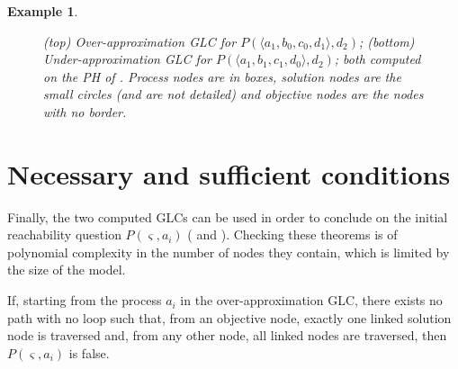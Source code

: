 \documentclass{movep}
\def\pref{\prettyref}
\newtheorem*{example*}{Example}{\itshape}{}
\newcommand{\PHfrappeB}{\Rsh}
\newcommand{\PHobjectif}[2]{\mbox{$#1\PHfrappeB^*\!#2$}}
\newcommand{\PHobj}{\PHobjectif}
\def\ctx{\varsigma}
\newcommand{\Pcai}{P(\ctx, a_i)}
\newcommand{\PHetat}[1]{\mbox{$\langle #1 \rangle$}}
\def\ctx{\varsigma}
\newcounter{la}
\begin{document}
\begin{example*}
\begin{figure}[ht]

\caption{\label{fig:glc}%
(top) Over-approximation GLC for $P(\PHetat{a_1,b_0,c_0,d_1}, d_2)$;
(bottom) Under-approximation GLC for $P(\PHetat{a_1,b_1,c_1,d_0}, d_2)$;
both computed on the PH of \pref{fig:ph}.
%
%
Process nodes are in boxes,
solution nodes are the small circles (and are not detailed)
and objective nodes are the nodes with no border.}
\end{figure}
\end{example*}



\section{Necessary and sufficient conditions}
\label{sec:th}

Finally, the two computed GLCs can be used in order to conclude on the initial reachability question
$\Pcai$ (\pref{th:oa} and \pref{th:ua}).
Checking these theorems is of polynomial complexity in the number of nodes they contain,
which is limited by the size of the model.

\begin{theorem}
\label{th:oa}
  If, starting from the process $a_i$ in the over-approximation GLC,
  there exists no path with no loop such that,
  from an objective node, exactly one linked solution node is traversed
  and, from any other node, all linked nodes are traversed,
  then $\Pcai$ is false.
\end{theorem}
\end{document}
